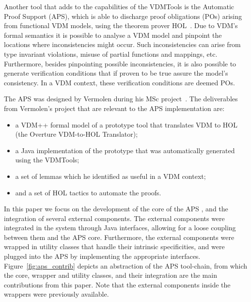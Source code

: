 \documentclass[]{article}
\begin{document}
Another tool that adds to the capabilities of the VDMTools is the Automatic Proof Support (APS), which is able to discharge proof obligations (POs) arising from functional VDM models, using the theorem prover HOL~\cite{DBLP:conf/tphol/Gordon91}.
Due to VDM's formal semantics it is possible to analyse a VDM model and pinpoint the locations where inconsistencies might occur.
Such inconsistencies can arise from type invariant violations, misuse of partial functions and mappings, etc.
Furthermore, besides pinpointing possible inconsistencies, it is also possible to generate verification conditions that if proven to be true assure the model's consistency.
In a VDM context, these verification conditions are deemed POs.


The APS was designed by Vermolen during his MSc project~\cite{Vermolen07}.
The deliverables from Vermolen's project that are relevant to the APS implementation are:
\begin{itemize}
  \item a VDM++ formal model of a prototype tool that translates VDM to HOL (the Overture VDM-to-HOL Translator);
  \item a Java implementation of the prototype that was automatically generated using the VDMTools;
  \item a set of lemmas which he identified as useful in a VDM context;
  \item and a set of HOL tactics to automate the proofs.
\end{itemize}

In this paper we focus on the development of the core of the APS , and the integration of several external components.
The external components were integrated in the system through Java interfaces, allowing for a loose coupling between them and the APS core.
Furthermore, the external components were wrapped in utility classes that handle their intrinsic specificities, and were plugged into the APS by implementing the appropriate interfaces.
Figure~\ref{fig:aps_contrib} depicts an abstraction of the APS tool-chain, from which the core, wrapper and utility classes, and their integration are the main contributions from this paper.
Note that the external components inside the wrappers were previously available.
\end{document}
